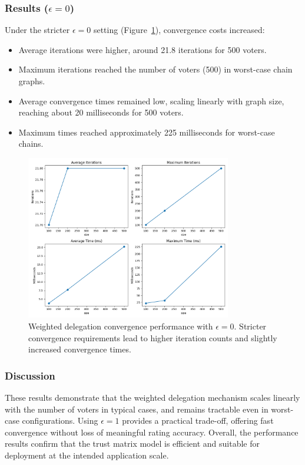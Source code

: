 \subsubsection*{Results ($\epsilon = 0$)}

Under the stricter $\epsilon = 0$ setting (Figure~\ref{fig:e0_perf}), convergence costs increased:
\begin{itemize}
    \item Average iterations were higher, around 21.8 iterations for 500 voters.
    \item Maximum iterations reached the number of voters (500) in worst-case chain graphs.
    \item Average convergence times remained low, scaling linearly with graph size, reaching about 20 milliseconds for 500 voters.
    \item Maximum times reached approximately 225 milliseconds for worst-case chains.
\end{itemize}

\begin{figure}[H]
    \centering
    \includegraphics[width=0.8\textwidth]{../common/perf_graphs/e_0.png}
    \caption{Weighted delegation convergence performance with $\epsilon = 0$. Stricter convergence requirements lead to higher iteration counts and slightly increased convergence times.}
    \label{fig:e0_perf}
\end{figure}

\subsubsection*{Discussion}

These results demonstrate that the weighted delegation mechanism scales linearly with the number of voters in typical cases, and remains tractable even in worst-case configurations. Using $\epsilon = 1$ provides a practical trade-off, offering fast convergence without loss of meaningful rating accuracy. Overall, the performance results confirm that the trust matrix model is efficient and suitable for deployment at the intended application scale.

